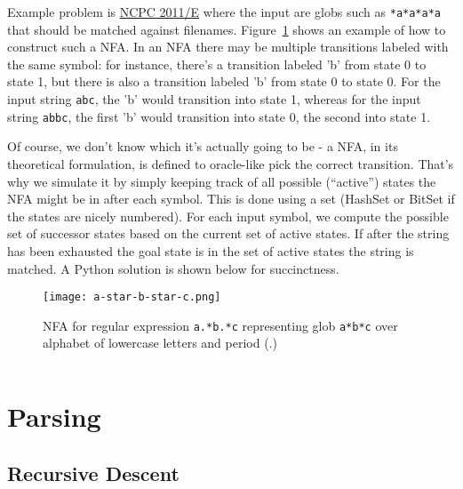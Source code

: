 Example problem is \href{http://ncpc.idi.ntnu.no/ncpc2011/ncpc2011problems.pdf}{NCPC 2011/E}
where the input are globs such as \texttt{*a*a*a*a} that should be matched against filenames.
Figure~\ref{fig:nfaexample} shows an example of how to construct such a NFA.
In an NFA there may be multiple transitions labeled with the same symbol: for instance,
there's a transition labeled 'b' from state 0 to state 1, but there is also a transition
labeled 'b' from state 0 to state 0.  For the input string \texttt{abc}, the 'b' would
transition into state 1, whereas for the input string \texttt{abbc}, the first 'b' would
transition into state 0, the second into state 1.

Of course, we don't know which it's actually going to be - a NFA, in its theoretical 
formulation, is defined to oracle-like pick the correct transition.  That's why we simulate
it by simply keeping track of all possible (``active'') states the NFA might be in after each symbol.
This is done using a set (HashSet or BitSet if the states are nicely numbered).
For each input symbol, we compute the possible set of successor states based on the
current set of active states.  If after the string has been exhausted the goal state
is in the set of active states the string is matched.
A Python solution is shown below for succinctness.

\begin{figure}
    \centering
    \texttt{[image: a-star-b-star-c.png]}
    \caption{NFA for regular expression \texttt{a.*b.*c} representing glob \texttt{a*b*c}
        over alphabet of lowercase letters and period (.)}
    \label{fig:nfaexample}
\end{figure}

\inputminted{python}{code/ls.py}

\section{Parsing}
\subsection{Recursive Descent}

